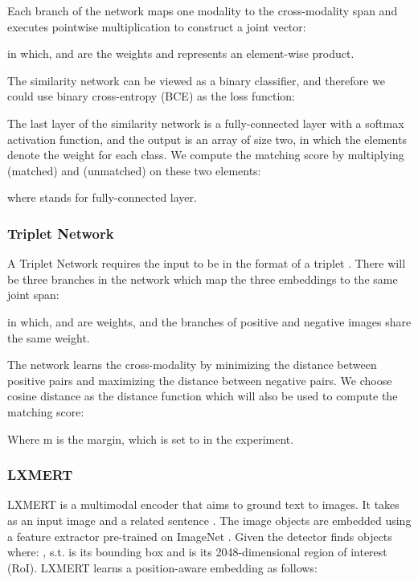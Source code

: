 \documentclass[11pt]{article}
\begin{document}
Each branch of the network maps one modality to the cross-modality span and executes pointwise multiplication to construct a joint vector:

in which,  and   are the weights and  represents an element-wise product.

The similarity network can be viewed as a binary classifier, and therefore we could use binary cross-entropy (BCE) as the loss function: 



The last layer of the similarity network is a fully-connected layer with a softmax activation function, and the output is an array of size two, in which the elements denote the weight for each class. We compute the matching score by multiplying  (matched) and  (unmatched) on these two elements:



where  stands for fully-connected layer.

\subsubsection{Triplet Network}
A Triplet Network requires the input to be in the format of a triplet . There will be three branches in the network which map the three embeddings to the same joint span:

in which,  and  are weights, and the branches of positive and negative images share the same weight.

The network learns the cross-modality by minimizing the distance between positive pairs and maximizing the distance between negative pairs. We choose cosine distance as the distance function which will also be used to compute the matching score:

Where m is the margin, which is set to  in the experiment.

\subsubsection{LXMERT}
LXMERT \cite{tan2019lxmert} is a multimodal encoder that aims to ground text to images. It takes as an input image  and a related sentence . The image objects are embedded using a feature extractor \cite{Anderson2017up-down} pre-trained on ImageNet \cite{deng2009imagenet}. Given  the detector finds  objects  where: , s.t.  is its bounding box and  is its 2048-dimensional region of interest (RoI). LXMERT learns a position-aware embedding as follows:  
\end{document}
